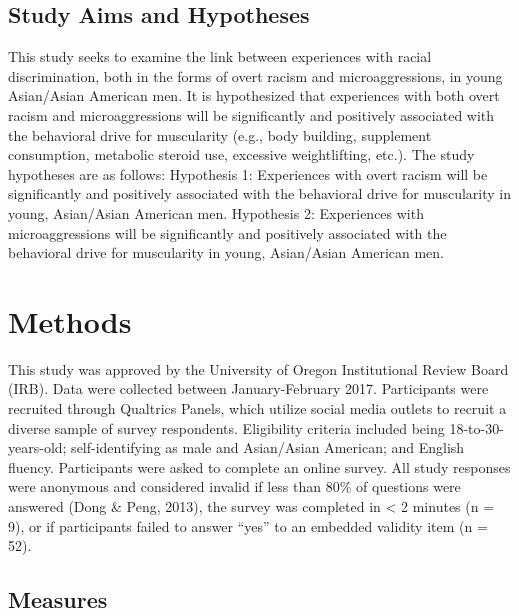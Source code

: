 \documentclass[
  english,
  man, fleqn, noextraspace,floatsintext]{apa6}
\begin{document}
\hypertarget{study-aims-and-hypotheses}{%
\subsection{\texorpdfstring{\textbf{Study Aims and Hypotheses}}{Study Aims and Hypotheses}}\label{study-aims-and-hypotheses}}

This study seeks to examine the link between experiences with racial discrimination, both in the forms of overt racism and microaggressions, in young Asian/Asian American men. It is hypothesized that experiences with both overt racism and microaggressions will be significantly and positively associated with the behavioral drive for muscularity (e.g., body building, supplement consumption, metabolic steroid use, excessive weightlifting, etc.). The study hypotheses are as follows:
Hypothesis 1: Experiences with overt racism will be significantly and positively associated with the behavioral drive for muscularity in young, Asian/Asian American men.
Hypothesis 2: Experiences with microaggressions will be significantly and positively associated with the behavioral drive for muscularity in young, Asian/Asian American men.

\hypertarget{methods}{%
\section{\texorpdfstring{\textbf{Methods}}{Methods}}\label{methods}}

This study was approved by the University of Oregon Institutional Review Board (IRB). Data were collected between January-February 2017. Participants were recruited through Qualtrics Panels, which utilize social media outlets to recruit a diverse sample of survey respondents. Eligibility criteria included being 18-to-30-years-old; self-identifying as male and Asian/Asian American; and English fluency. Participants were asked to complete an online survey. All study responses were anonymous and considered invalid if less than 80\% of questions were answered (Dong \& Peng, 2013), the survey was completed in \textless{} 2 minutes (n = 9), or if participants failed to answer ``yes'' to an embedded validity item (n = 52).

\hypertarget{measures}{%
\subsection{\texorpdfstring{\textbf{Measures}}{Measures}}\label{measures}}
\end{document}
